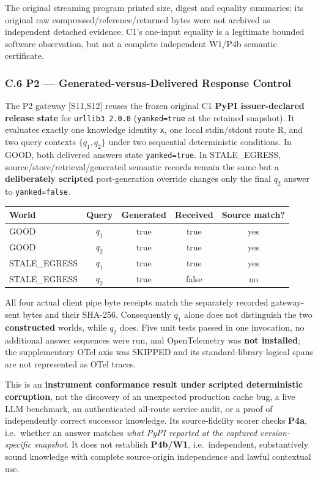 \documentclass[
  10pt,
  american,
  a4paper,
]{article}
\begin{document}
The original streaming program printed size, digest and equality
summaries; its original raw compressed/reference/returned bytes were not
archived as independent detached evidence. C1's one-input equality is a
legitimate bounded software observation, but not a complete independent
W1/P4b semantic certificate.

\hypertarget{c.6-p2-generated-versus-delivered-response-control}{%
\subsubsection{C.6 P2 --- Generated-versus-Delivered Response
Control}\label{c.6-p2-generated-versus-delivered-response-control}}

The P2 gateway {[}S11,S12{]} reuses the frozen original C1 \textbf{PyPI
issuer-declared release state} for \texttt{urllib3\ 2.0.0}
(\texttt{yanked=true} at the retained snapshot). It evaluates exactly
one knowledge identity \texttt{x}, one local stdin/stdout route R, and
two query contexts \(\{q_1,q_2\}\) under two sequential deterministic
conditions. In GOOD, both delivered answers state \texttt{yanked=true}.
In STALE\_EGRESS, source/store/retrieval/generated semantic records
remain the same but a \textbf{deliberately scripted} post-generation
override changes only the final \(q_2\) answer to \texttt{yanked=false}.

\begin{center}
\small
\begin{tabular}{lcccc}
\hline
World & Query & Generated & Received & Source match? \\
\hline
GOOD & $q_1$ & true & true & yes \\
GOOD & $q_2$ & true & true & yes \\
STALE\_EGRESS & $q_1$ & true & true & yes \\
STALE\_EGRESS & $q_2$ & true & false & no \\
\hline
\end{tabular}
\end{center}

All four actual client pipe byte receipts match the separately recorded
gateway-sent bytes and their SHA-256. Consequently \(q_1\) alone does
not distinguish the two \textbf{constructed} worlds, while \(q_2\) does.
Five unit tests passed in one invocation, no additional answer sequences
were run, and OpenTelemetry was \textbf{not installed}; the
supplementary OTel axis was SKIPPED and its standard-library logical
spans are not represented as OTel traces.

This is an \textbf{instrument conformance result under scripted
deterministic corruption}, not the discovery of an unexpected production
cache bug, a live LLM benchmark, an authenticated all-route service
audit, or a proof of independently correct successor knowledge. Its
source-fidelity scorer checks \textbf{P4a}, i.e.~whether an answer
matches \emph{what PyPI reported at the captured version-specific
snapshot}. It does not establish \textbf{P4b/W1}, i.e.~independent,
substantively sound knowledge with complete source-origin independence
and lawful contextual use.
\end{document}
